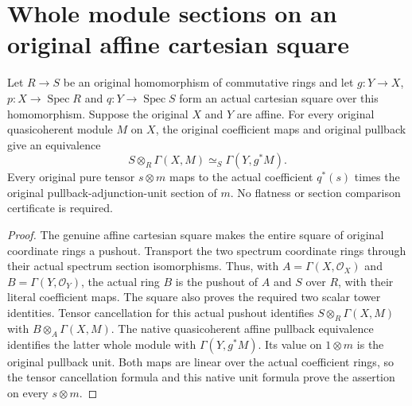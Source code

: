 \section{Whole module sections on an original affine cartesian square}

\begin{lemma}\label{lem:fc-affine-cartesian-module-base-change}
\leanok
{}
Let $R\to S$ be an original homomorphism of commutative rings and let
$g:Y\to X$, $p:X\to\operatorname{Spec}R$ and
$q:Y\to\operatorname{Spec}S$ form an actual cartesian square over this
homomorphism. Suppose the original $X$ and $Y$ are affine. For every
original quasicoherent module $M$ on $X$, the original coefficient maps
and original pullback give an equivalence
\[
 S\otimes_R\Gamma(X,M)\simeq_S\Gamma(Y,g^*M).
\]
Every original pure tensor $s\otimes m$ maps to the actual coefficient
$q^*(s)$ times the original pullback-adjunction-unit section of $m$.
No flatness or section comparison certificate is required.
\end{lemma}
\begin{proof}
The genuine affine cartesian square makes the entire square of original
coordinate rings a pushout. Transport the two spectrum coordinate
rings through their actual spectrum section isomorphisms. Thus, with
$A=\Gamma(X,\mathcal O_X)$ and $B=\Gamma(Y,\mathcal O_Y)$, the actual
ring $B$ is the pushout of $A$ and $S$ over $R$, with their literal
coefficient maps. The square also proves the required two scalar tower
identities. Tensor cancellation for this actual pushout identifies
$S\otimes_R\Gamma(X,M)$ with $B\otimes_A\Gamma(X,M)$. The native
quasicoherent affine pullback equivalence identifies the latter whole
module with $\Gamma(Y,g^*M)$. Its value on $1\otimes m$ is the original
pullback unit. Both maps are linear over the actual coefficient rings,
so the tensor cancellation formula and this native unit formula prove
the assertion on every $s\otimes m$.
\end{proof}
